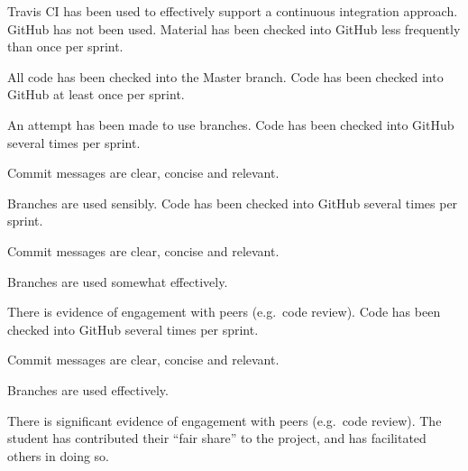 \documentclass{../fal_assignment}
\begin{document}
\begin{markingrubric}
            \par Travis CI has been used to effectively support a continuous integration approach.
%
        \grade\fail GitHub has not been used.
        \grade Material has been checked into GitHub less frequently than once per sprint.
            \par All code has been checked into the Master branch.
        \grade Code has been checked into GitHub at least once per sprint.
            \par An attempt has been made to use branches.
        \grade Code has been checked into GitHub several times per sprint.
            \par Commit messages are clear, concise and relevant.
            \par Branches are used sensibly.
        \grade Code has been checked into GitHub several times per sprint.
            \par Commit messages are clear, concise and relevant.
            \par Branches are used somewhat effectively.
            \par There is evidence of engagement with peers (e.g.\ code review).
        \grade Code has been checked into GitHub several times per sprint.
            \par Commit messages are clear, concise and relevant.
            \par Branches are used effectively.
            \par There is significant evidence of engagement with peers (e.g.\ code review).
%
        \grade The student has contributed their ``fair share'' to the project,
            and has facilitated others in doing so.
\end{markingrubric}
\end{document}
